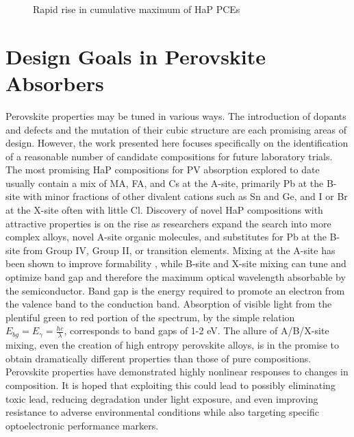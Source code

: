  
\begin{figure}[htbp]
\centering

\caption{\label{fig:nrel} Rapid rise in cumulative maximum of HaP PCEs}
\end{figure}

\section{Design Goals in Perovskite Absorbers}
\label{sec:orgbd6587f}
Perovskite properties may be tuned in various ways.
The introduction of dopants and defects \autocite{kim-2020-upper-limit,dahliah-2021-high-throug} and the mutation of their cubic structure \autocite{kar-2018-comput-screen,kim-2017-hybrid-organ} are each promising areas of design.
However, the work presented here focuses specifically on the identification of a reasonable number of candidate compositions for future laboratory trials.
The most promising HaP compositions for PV absorption explored to date usually contain a mix of MA, FA, and Cs at the A-site, primarily Pb at the B-site with minor fractions of other divalent cations such as Sn and Ge, and I or Br at the X-site often with little Cl.
Discovery of novel HaP compositions with attractive properties is on the rise as researchers expand the search into more complex alloys, novel A-site organic molecules, and substitutes for Pb at the B-site from Group IV, Group II, or transition elements.
\autocite{zhu-2019-struc-elect,banerjee-2019-rashb-trigg,ding-2019-cesium-decreas,greenland-2020-correl-phase}
Mixing at the A-site has been shown to improve formability \autocite{zhang-2019-perov-photov}, while B-site and X-site mixing can tune and optimize band gap and therefore the maximum optical wavelength absorbable by the semiconductor.
Band gap is the energy required to promote an electron from the valence band to the conduction band.
Absorption of visible light from the plentiful green to red portion of the spectrum, by the simple relation \(E_{bg} = E_\gamma = \frac{hc}{\lambda}\), corresponds to band gaps of 1-2 \unit{\electronvolt}.
The allure of A/B/X-site mixing, even the creation of high entropy perovskite alloys, is in the promise to obtain dramatically different properties than those of pure compositions.
Perovskite properties have demonstrated highly nonlinear responses to changes in composition.
It is hoped that exploiting this could lead to possibly eliminating toxic lead, reducing degradation under light exposure, and even improving resistance to adverse environmental conditions while also targeting specific optoelectronic performance markers.

